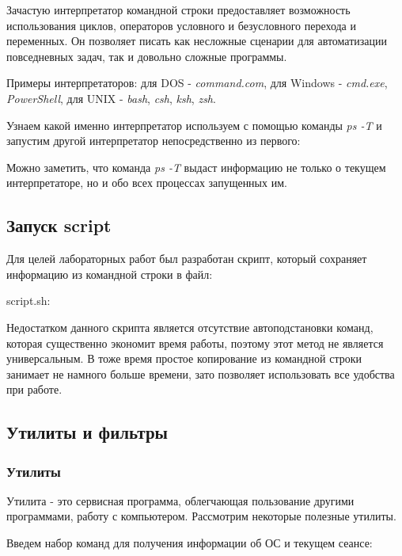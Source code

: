 \documentclass[14pt,a4paper,report]{report}
\begin{document}
Зачастую интерпретатор командной строки предоставляет возможность использования циклов, операторов условного и безусловного перехода и переменных. Он позволяет писать как несложные сценарии для автоматизации повседневных задач, так и довольно сложные программы.

Примеры интерпретаторов: для DOS - \emph{command.com}, для Windows - \emph{cmd.exe}, \emph{PowerShell}, для UNIX - \emph{bash}, \emph{csh}, \emph{ksh}, \emph{zsh}.

Узнаем какой именно интерпретатор используем с помощью команды \emph{ps -T} и запустим другой интерпретатор непосредственно из первого:



Можно заметить, что команда \emph{ps -T} выдаст информацию не только о текущем интерпретаторе, но и обо всех процессах запущенных им.

\subsection{Запуск script}

Для целей лабораторных работ был разработан скрипт, который сохраняет информацию из командной строки в файл:

script.sh:



Недостатком данного скрипта является отсутствие автоподстановки команд, которая существенно экономит время работы, поэтому этот метод не является универсальным. В тоже время простое копирование из командной строки занимает не намного больше времени, зато позволяет использовать все удобства при работе.

\subsection{Утилиты и фильтры}

\subsubsection{Утилиты}

Утилита - это сервисная программа, облегчающая пользование другими программами, работу с компьютером. Рассмотрим некоторые полезные утилиты.

Введем набор команд для получения информации об ОС и текущем сеансе:


\end{document}

